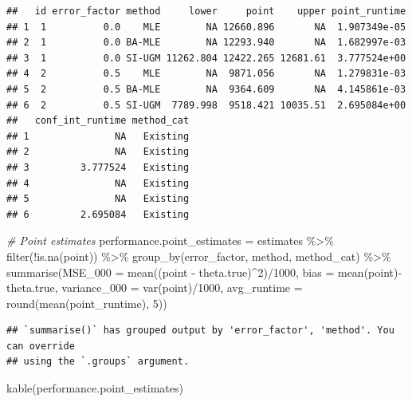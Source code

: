 \documentclass[
]{article}
\newenvironment{Shaded}{\begin{snugshade}}{\end{snugshade}}
\newcommand{\AttributeTok}[1]{\textcolor[rgb]{0.77,0.63,0.00}{#1}}
\newcommand{\CommentTok}[1]{\textcolor[rgb]{0.56,0.35,0.01}{\textit{#1}}}
\newcommand{\DecValTok}[1]{\textcolor[rgb]{0.00,0.00,0.81}{#1}}
\newcommand{\FunctionTok}[1]{\textcolor[rgb]{0.00,0.00,0.00}{#1}}
\newcommand{\NormalTok}[1]{#1}
\newcommand{\OtherTok}[1]{\textcolor[rgb]{0.56,0.35,0.01}{#1}}
\newcommand{\SpecialCharTok}[1]{\textcolor[rgb]{0.00,0.00,0.00}{#1}}
\begin{document}
\begin{verbatim}
##   id error_factor method     lower     point    upper point_runtime
## 1  1          0.0    MLE        NA 12660.896       NA  1.907349e-05
## 2  1          0.0 BA-MLE        NA 12293.940       NA  1.682997e-03
## 3  1          0.0 SI-UGM 11262.804 12422.265 12681.61  3.777524e+00
## 4  2          0.5    MLE        NA  9871.056       NA  1.279831e-03
## 5  2          0.5 BA-MLE        NA  9364.609       NA  4.145861e-03
## 6  2          0.5 SI-UGM  7789.998  9518.421 10035.51  2.695084e+00
##   conf_int_runtime method_cat
## 1               NA   Existing
## 2               NA   Existing
## 3         3.777524   Existing
## 4               NA   Existing
## 5               NA   Existing
## 6         2.695084   Existing
\end{verbatim}

\begin{Shaded}
\begin{Highlighting}[]
\CommentTok{\# Point estimates}
\NormalTok{performance.point\_estimates }\OtherTok{=}\NormalTok{ estimates }\SpecialCharTok{\%\textgreater{}\%}
  \FunctionTok{filter}\NormalTok{(}\SpecialCharTok{!}\FunctionTok{is.na}\NormalTok{(point)) }\SpecialCharTok{\%\textgreater{}\%}
  \FunctionTok{group\_by}\NormalTok{(error\_factor, method, method\_cat) }\SpecialCharTok{\%\textgreater{}\%}
  \FunctionTok{summarise}\NormalTok{(}\AttributeTok{MSE\_000 =} \FunctionTok{mean}\NormalTok{((point }\SpecialCharTok{{-}}\NormalTok{ theta.true)}\SpecialCharTok{\^{}}\DecValTok{2}\NormalTok{)}\SpecialCharTok{/}\DecValTok{1000}\NormalTok{,}
            \AttributeTok{bias =} \FunctionTok{mean}\NormalTok{(point)}\SpecialCharTok{{-}}\NormalTok{theta.true,}
            \AttributeTok{variance\_000 =} \FunctionTok{var}\NormalTok{(point)}\SpecialCharTok{/}\DecValTok{1000}\NormalTok{,}
            \AttributeTok{avg\_runtime =} \FunctionTok{round}\NormalTok{(}\FunctionTok{mean}\NormalTok{(point\_runtime), }\DecValTok{5}\NormalTok{))}
\end{Highlighting}
\end{Shaded}

\begin{verbatim}
## `summarise()` has grouped output by 'error_factor', 'method'. You can override
## using the `.groups` argument.
\end{verbatim}

\begin{Shaded}
\begin{Highlighting}[]
\FunctionTok{kable}\NormalTok{(performance.point\_estimates)}
\end{Highlighting}
\end{Shaded}
\end{document}
